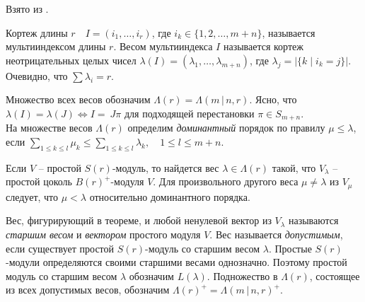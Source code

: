 Взято из \cite{borel_subalgebras}.

\begin{definition}
Кортеж длины $r \quad I = (i_1, \ldots, i_r) $, где $ i_k \in \{1, 2, \ldots, m+n\} $, называется мультииндексом длины $r$. 
Весом мультииндекса $I$ называется кортеж неотрицательных целых чисел $ \lambda (I) = (\lambda_1, \ldots, \lambda_{m + n}) $, 
где $ \lambda_j = | \{k \;|\; i_k = j\} |$. Очевидно, что $\sum \lambda_i = r $.
\end{definition}
Множество всех весов обозначим $ \Lambda(r) = \Lambda(m\,|\,n, r) $. 
Ясно, что $ \lambda(I) = \lambda(J) \iff I = ~J\pi $ для подходящей перестановки $ \pi \in S_{m+n} $. \\
На множестве весов $\Lambda(r)$ определим \textit{доминантный} порядок по правилу $ \mu \leq \lambda $, 
если $ \sum\limits_{1 \leqslant k \leqslant l} \mu_k \leq \sum\limits_{1 \leqslant k \leqslant l} \lambda_k, \quad 1 \leqslant l \leqslant m + n $.
\begin{theorem}
Если $V$ -- простой $S(r)$-модуль, то найдется вес $\lambda \in \Lambda(r)$ такой, что $ V_{\lambda} $ -- простой цоколь $ B(r)^+ $-модуля $V$. 
Для произвольного другого веса $ \mu \neq \lambda $ из $ V_{\mu} $ следует, что $ \mu < \lambda $ относительно доминантного порядка.
\end{theorem}
Вес, фигурирующий в теореме, и любой ненулевой вектор из $ V_{\lambda} $ называются \textit{старшим весом} и \textit{вектором} простого модуля $V$.
Вес называется \textit{допустимым}, если существует простой $ S(r) $-модуль со старшим весом $\lambda$. 
Простые $S(r)$-модули определяются своими  старшими весами однозначно. Поэтому простой модуль со старшим весом $\lambda$ обозначим $L(\lambda)$. 
Подножество в $\Lambda(r)$, состоящее из всех допустимых весов, обозначим $ \Lambda(r)^+ = \Lambda(m\,|\,n, r)^+ $.
